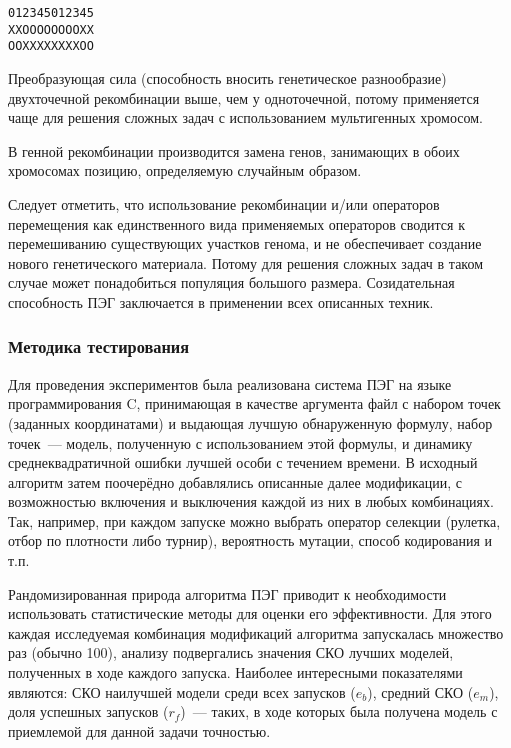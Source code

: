 \begin{alltt}
012345012345
XXOOOOOOOOXX
OOXXXXXXXXOO
\end{alltt}

Преобразующая сила (способность вносить генетическое разнообразие) двухточечной рекомбинации выше, чем у одноточечной, потому применяется чаще для решения сложных задач с использованием мультигенных хромосом.

В генной рекомбинации производится замена генов, занимающих в обоих хромосомах позицию, определяемую случайным образом.

Следует отметить, что использование рекомбинации и/или операторов перемещения как единственного вида применяемых операторов сводится к перемешиванию существующих участков генома, и не обеспечивает создание нового генетического материала. Потому для решения сложных задач в таком случае может понадобиться популяция большого размера. Созидательная способность ПЭГ заключается в применении всех описанных техник.


\subsubsection{Методика тестирования}

Для проведения экспериментов была реализована система ПЭГ на языке программирования C, принимающая в качестве аргумента файл с набором точек (заданных координатами) и выдающая лучшую обнаруженную формулу, набор точек~--- модель, полученную с использованием этой формулы, и динамику среднеквадратичной ошибки лучшей особи с течением времени. В исходный алгоритм затем поочерёдно добавлялись описанные далее модификации, с возможностью включения и выключения каждой из них в любых комбинациях.  Так, например, при каждом запуске можно выбрать оператор селекции (рулетка, отбор по плотности либо турнир), вероятность мутации, способ кодирования и т.п.

Рандомизированная природа алгоритма ПЭГ приводит к необходимости использовать статистические методы для оценки его эффективности. Для этого каждая исследуемая комбинация модификаций алгоритма запускалась множество раз (обычно 100), анализу подвергались значения СКО лучших моделей, полученных в ходе каждого запуска. Наиболее интересными показателями являются: СКО наилучшей модели среди всех запусков ($e_{b}$), средний СКО ($e_{m}$), доля успешных запусков ($r_{f}$)~--- таких, в ходе которых была получена модель с приемлемой для данной задачи точностью.

